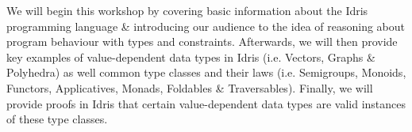 We will begin this workshop by covering basic information about the Idris programming language \& introducing our audience to the idea of reasoning about program behaviour with types and constraints. Afterwards,
we will then provide key examples of value-dependent data types in Idris (i.e. Vectors, Graphs \& Polyhedra) as well common type classes and their laws (i.e. Semigroups, Monoids, Functors, Applicatives, Monads, Foldables \& Traversables).
Finally, we will provide proofs in Idris that certain value-dependent data types are valid instances of these type classes.
